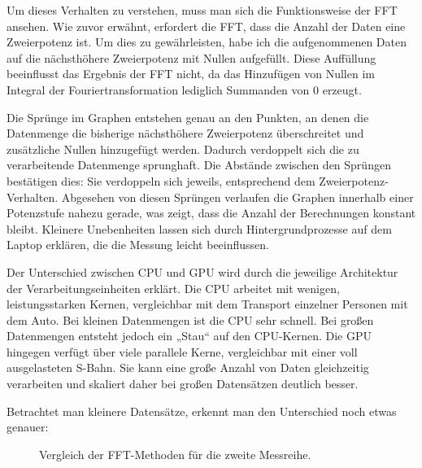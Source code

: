 \documentclass[a4paper,12pt]{article}
\theoremstyle{definition}
\theoremstyle{remark}
\begin{document}
Um dieses Verhalten zu verstehen, muss man sich die Funktionsweise der FFT ansehen. Wie zuvor erwähnt, erfordert die FFT, dass die 
Anzahl der Daten eine Zweierpotenz ist. Um dies zu gewährleisten, habe ich die aufgenommenen Daten auf die nächsthöhere Zweierpotenz 
mit Nullen aufgefüllt. Diese Auffüllung beeinflusst das Ergebnis der FFT nicht, da das Hinzufügen von Nullen im Integral der 
Fouriertransformation lediglich Summanden von 0 erzeugt.

Die Sprünge im Graphen entstehen genau an den Punkten, an denen die Datenmenge die bisherige nächsthöhere Zweierpotenz überschreitet und 
zusätzliche Nullen hinzugefügt werden. Dadurch verdoppelt sich die zu verarbeitende Datenmenge sprunghaft. Die Abstände zwischen den Sprüngen 
bestätigen dies: Sie verdoppeln sich jeweils, entsprechend dem Zweierpotenz-Verhalten. Abgesehen von diesen Sprüngen verlaufen die Graphen 
innerhalb einer Potenzstufe nahezu gerade, was zeigt, dass die Anzahl der Berechnungen konstant bleibt. Kleinere Unebenheiten lassen sich 
durch Hintergrundprozesse auf dem Laptop erklären, die die Messung leicht beeinflussen.

Der Unterschied zwischen CPU und GPU wird durch die jeweilige Architektur der Verarbeitungseinheiten erklärt. Die CPU arbeitet mit wenigen, 
leistungsstarken Kernen, vergleichbar mit dem Transport einzelner Personen mit dem Auto. Bei kleinen Datenmengen ist die CPU sehr schnell. 
Bei großen Datenmengen entsteht jedoch ein „Stau“ auf den CPU-Kernen. Die GPU hingegen verfügt über viele parallele Kerne, vergleichbar mit 
einer voll ausgelasteten S-Bahn. Sie kann eine große Anzahl von Daten gleichzeitig verarbeiten und skaliert daher bei großen Datensätzen 
deutlich besser. 

Betrachtet man kleinere Datensätze, erkennt man den Unterschied noch etwas genauer:

\begin{figure}[H]
  \centering
  \caption{Vergleich der FFT-Methoden für die zweite Messreihe.}
\end{figure}
\end{document}
